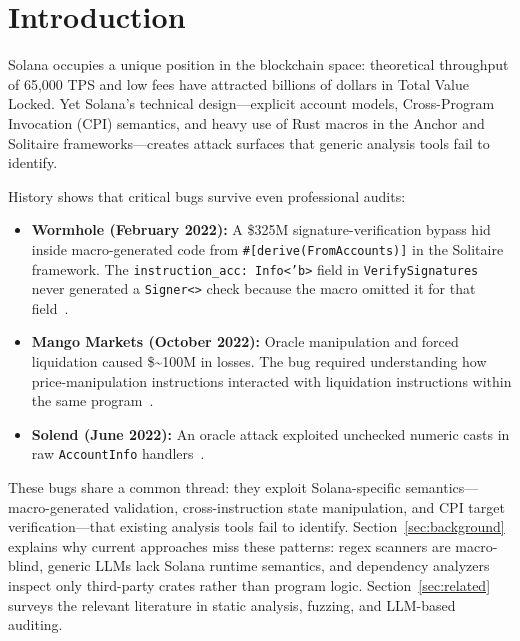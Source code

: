 \documentclass{article}
\begin{document}


\section{Introduction}
\label{sec:intro}

Solana occupies a unique position in the blockchain space: theoretical throughput of 65,000 TPS and low fees have attracted billions of dollars in Total Value Locked. Yet Solana's technical design---explicit account models, Cross-Program Invocation (CPI) semantics, and heavy use of Rust macros in the Anchor and Solitaire frameworks---creates attack surfaces that generic analysis tools fail to identify.

History shows that critical bugs survive even professional audits:

\begin{itemize}
  \item \textbf{Wormhole (February 2022):} A \$325M signature-verification bypass hid inside macro-generated code from \texttt{\#[derive(FromAccounts)]} in the Solitaire framework. The \texttt{instruction\_acc: Info<'b>} field in \texttt{VerifySignatures} never generated a \texttt{Signer<>} check because the macro omitted it for that field~\citep{wormhole2026solitaire}.
  \item \textbf{Mango Markets (October 2022):} Oracle manipulation and forced liquidation caused \$\textasciitilde100M in losses. The bug required understanding how price-manipulation instructions interacted with liquidation instructions within the same program~\citep{ottersec2022mango}.
  \item \textbf{Solend (June 2022):} An oracle attack exploited unchecked numeric casts in raw \texttt{AccountInfo} handlers~\citep{neodyme2022solend}.
\end{itemize}

These bugs share a common thread: they exploit Solana-specific semantics---macro-generated validation, cross-instruction state manipulation, and CPI target verification---that existing analysis tools fail to identify. Section~\ref{sec:background} explains why current approaches miss these patterns: regex scanners are macro-blind, generic LLMs lack Solana runtime semantics, and dependency analyzers inspect only third-party crates rather than program logic. Section~\ref{sec:related} surveys the relevant literature in static analysis, fuzzing, and LLM-based auditing.
\end{document}
